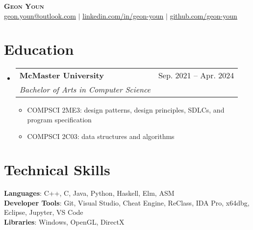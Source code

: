 \documentclass[letterpaper,11pt]{article}
\makeatletter
\newcommand{\resumeItem}[1]{
  \item\small{
    {#1 \vspace{-2pt}}
  }
}
\newcommand{\resumeSubheading}[4]{
  \vspace{-2pt}\item
    \begin{tabular*}{0.97\textwidth}[t]{l@{\extracolsep{\fill}}r}
      \textbf{#1} & #2 \\
      \textit{\small#3} & \textit{\small #4} \\
    \end{tabular*}\vspace{-7pt}
}
\newcommand{\resumeSubHeadingListStart}{\begin{itemize}[leftmargin=0.15in, label={}]}
\newcommand{\resumeSubHeadingListEnd}{\end{itemize}}
\newcommand{\resumeItemListStart}{\begin{itemize}}
\newcommand{\resumeItemListEnd}{\end{itemize}\vspace{-5pt}}
\makeatother
\begin{document}
\begin{center}
	\textbf{\Huge \scshape Geon Youn} \\ \vspace{1pt}
	\small \href{mailto:geon.youn@outlook.com}{\underline{geon.youn@outlook.com}} $|$ 
	\href{https://linkedin.com/in/geon-youn}{\underline{linkedin.com/in/geon-youn}} $|$
	\href{https://github.com/geon-youn}{\underline{github.com/geon-youn}}
\end{center}

\section{Education}
\resumeSubHeadingListStart
	\resumeSubheading
		{McMaster University}{Sep. 2021 -- Apr. 2024}
		{Bachelor of Arts in Computer Science}{}
	\resumeItemListStart
		\resumeItem{COMPSCI 2ME3: design patterns, design principles, SDLCs, and program specification}
		\resumeItem{COMPSCI 2C03: data structures and algorithms}
	\resumeItemListEnd
\resumeSubHeadingListEnd
  
\section{Technical Skills}
\begin{itemize}[leftmargin=0.15in, label={}]
	\small{\item{
		\textbf{Languages}{: C++, C, Java, Python, Haskell, Elm, ASM} \\
		\textbf{Developer Tools}{: Git, Visual Studio, Cheat Engine, ReClass, IDA Pro, x64dbg,  Eclipse, Jupyter, VS Code} \\
		\textbf{Libraries}{: Windows, OpenGL, DirectX}
    }}
\end{itemize}

%
      
\end{document}
